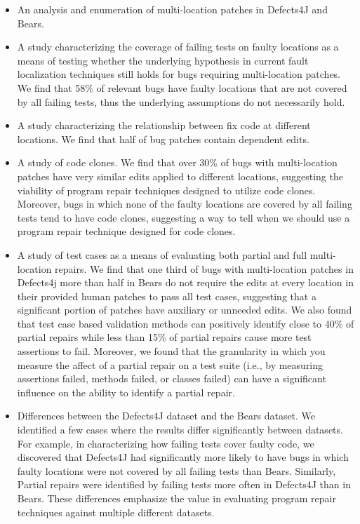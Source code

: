 \documentclass[sigconf, timestamp-false, anonymous=true]{acmart}
\begin{document}
\begin{itemize}
\item An analysis and enumeration of multi-location patches in Defects4J and Bears.
\item A study characterizing the coverage of failing tests on faulty locations
  as a means of testing whether the underlying hypothesis in current fault
  localization techniques still holds for bugs requiring multi-location
  patches. We find that 58\% of relevant bugs have faulty locations that are not
  covered by all failing tests, thus the underlying assumptions do not
  necessarily hold.
\item A study characterizing the relationship between fix code at different locations.  We 
find that half of bug patches contain dependent edits.
\item A study of code clones. We find that over 30\% of bugs with multi-location
patches have very similar edits applied to different locations, suggesting the viability of 
program repair techniques designed to utilize code clones. Moreover, bugs in which 
none of the faulty locations are covered by all failing tests tend to have code clones, 
suggesting a way to tell when we should use a program repair technique designed for code 
clones.
\item A study of test cases as a means of evaluating both partial and full
  multi-location repairs.  We find that one third of bugs with multi-location
  patches in Defects4j more than half in Bears do not require the edits at every
  location in their provided human patches to pass all test cases, suggesting that a 
  significant portion of patches have auxiliary or unneeded edits. We also found that test 
  case based validation methods can positively identify close to 40\% of partial repairs
  while less than
  15\% of partial repairs cause more test assertions to fail. Moreover, we found that the 
  granularity in which you measure the affect of a partial repair on a test suite (i.e., by 
  measuring assertions failed, methods failed, or classes failed) can have a significant 
  influence on the ability to identify a partial repair.
\item Differences between the Defects4J dataset and the Bears dataset. We identified a 
few cases where the results differ significantly between datasets. For example, in 
characterizing how failing tests cover faulty code, we discovered that Defects4J had 
significantly more likely to have bugs in which faulty locations were not covered by all 
failing tests than Bears. Similarly, Partial repairs were identified by failing tests more often 
in Defects4J than in Bears. These differences emphasize the value in evaluating program 
repair techniques against multiple different datasets.
\end{itemize}
\end{document}
